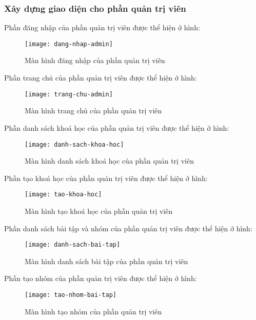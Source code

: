 \documentclass[../Thesis.tex]{subfiles}
\begin{document}
    \subsubsection{Xây dựng giao diện cho phần quản trị viên}
    \label{subsubsec:xay-dung-giao-dien-admin}
    
        Phần đăng nhập của phần quản trị viên được thể hiện ở hình:
        \begin{figure}[ht!]
            \centering\texttt{[image: dang-nhap-admin]}
            \caption{Màn hình đăng nhập của phần quản trị viên}
            \label{fig:dang-nhap-admin}
        \end{figure}

        Phần trang chủ của phần quản trị viên được thể hiện ở hình:
        \begin{figure}[ht!]
            \centering\texttt{[image: trang-chu-admin]}
            \caption{Màn hình trang chủ của phần quản trị viên}
            \label{fig:trang-chu-admin}
        \end{figure}

        Phần danh sách khoá học của phần quản trị viên được thể hiện ở hình:
        \begin{figure}[ht!]
            \centering\texttt{[image: danh-sach-khoa-hoc]}
            \caption{Màn hình danh sách khoá học của phần quản trị viên}
            \label{fig:danh-sach-khoa-hoc}
        \end{figure}

        Phần tạo khoá học của phần quản trị viên được thể hiện ở hình:
        \begin{figure}[ht!]
            \centering\texttt{[image: tao-khoa-hoc]}
            \caption{Màn hình tạo khoá học của phần quản trị viên}
            \label{fig:tao-khoa-hoc}
        \end{figure}


        Phần danh sách bài tập và nhóm của phần quản trị viên được thể hiện ở hình:
        \begin{figure}[ht!]
            \centering\texttt{[image: danh-sach-bai-tap]}
            \caption{Màn hình danh sách bài tập của phần quản trị viên}
            \label{fig:danh-sach-bai-tap}
        \end{figure}

        Phần tạo nhóm của phần quản trị viên được thể hiện ở hình:
        \begin{figure}[ht!]
            \centering\texttt{[image: tao-nhom-bai-tap]}
            \caption{Màn hình tạo nhóm của phần quản trị viên}
            \label{fig:tao-nhom-bai-tap}
        \end{figure}
\end{document}
